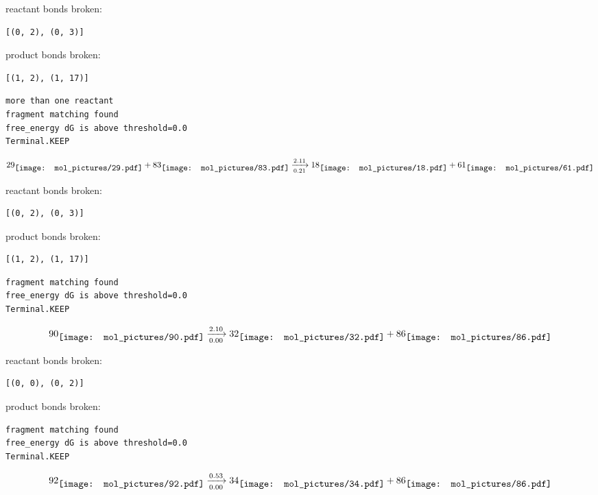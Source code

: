 \documentclass{article}
\begin{document}
reactant bonds broken:\begin{verbatim}
[(0, 2), (0, 3)]
\end{verbatim}
product bonds broken:\begin{verbatim}
[(1, 2), (1, 17)]
\end{verbatim}




\vspace{1cm}
\begin{verbatim}
more than one reactant
fragment matching found
free_energy dG is above threshold=0.0
Terminal.KEEP
\end{verbatim}
$$
29
\raisebox{-.5\height}{\texttt{[image: mol\_pictures/29.pdf]}}
+
83
\raisebox{-.5\height}{\texttt{[image: mol\_pictures/83.pdf]}}
\xrightarrow[0.21]{2.11}
18
\raisebox{-.5\height}{\texttt{[image: mol\_pictures/18.pdf]}}
+
61
\raisebox{-.5\height}{\texttt{[image: mol\_pictures/61.pdf]}}
$$


reactant bonds broken:\begin{verbatim}
[(0, 2), (0, 3)]
\end{verbatim}
product bonds broken:\begin{verbatim}
[(1, 2), (1, 17)]
\end{verbatim}




\vspace{1cm}
\begin{verbatim}
fragment matching found
free_energy dG is above threshold=0.0
Terminal.KEEP
\end{verbatim}
$$
90
\raisebox{-.5\height}{\texttt{[image: mol\_pictures/90.pdf]}}
\xrightarrow[0.00]{2.10}
32
\raisebox{-.5\height}{\texttt{[image: mol\_pictures/32.pdf]}}
+
86
\raisebox{-.5\height}{\texttt{[image: mol\_pictures/86.pdf]}}
$$


reactant bonds broken:\begin{verbatim}
[(0, 0), (0, 2)]
\end{verbatim}
product bonds broken:



\vspace{1cm}
\begin{verbatim}
fragment matching found
free_energy dG is above threshold=0.0
Terminal.KEEP
\end{verbatim}
$$
92
\raisebox{-.5\height}{\texttt{[image: mol\_pictures/92.pdf]}}
\xrightarrow[0.00]{0.53}
34
\raisebox{-.5\height}{\texttt{[image: mol\_pictures/34.pdf]}}
+
86
\raisebox{-.5\height}{\texttt{[image: mol\_pictures/86.pdf]}}
$$
\end{document}
